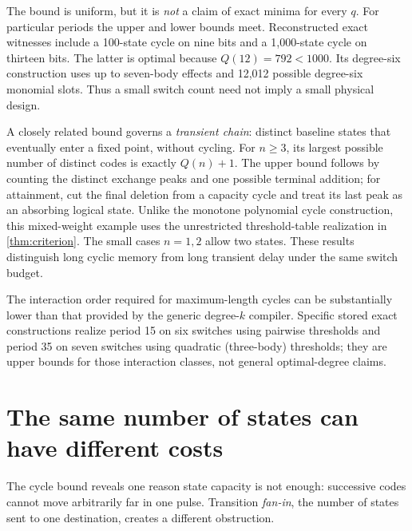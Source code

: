 \documentclass[12pt,letterpaper]{article}
\theoremstyle{definition}\newtheorem{definition}[theorem]{Definition}
\theoremstyle{remark}\newtheorem{remark}[theorem]{Remark}
\begin{document}
The bound is uniform, but it is \emph{not} a claim of exact minima for every $q$. For particular periods the upper and lower bounds meet. Reconstructed exact witnesses include a 100-state cycle on nine bits and a 1,000-state cycle on thirteen bits. The latter is optimal because $Q(12)=792<1000$. Its degree-six construction uses up to seven-body effects and 12,012 possible degree-six monomial slots. Thus a small switch count need not imply a small physical design.

A closely related bound governs a \emph{transient chain}: distinct baseline states that eventually enter a fixed point, without cycling. For $n\ge3$, its largest possible number of distinct codes is exactly $Q(n)+1$. The upper bound follows by counting the distinct exchange peaks and one possible terminal addition; for attainment, cut the final deletion from a capacity cycle and treat its last peak as an absorbing logical state. Unlike the monotone polynomial cycle construction, this mixed-weight example uses the unrestricted threshold-table realization in \cref{thm:criterion}. The small cases $n=1,2$ allow two states. These results distinguish long cyclic memory from long transient delay under the same switch budget.

The interaction order required for maximum-length cycles can be substantially lower than that provided by the generic degree-$k$ compiler. Specific stored exact constructions realize period 15 on six switches using pairwise thresholds and period 35 on seven switches using quadratic (three-body) thresholds; they are upper bounds for those interaction classes, not general optimal-degree claims.

\section{The same number of states can have different costs}\label{sec:tasks}
The cycle bound reveals one reason state capacity is not enough: successive codes cannot move arbitrarily far in one pulse. Transition \emph{fan-in}, the number of states sent to one destination, creates a different obstruction.
\end{document}
